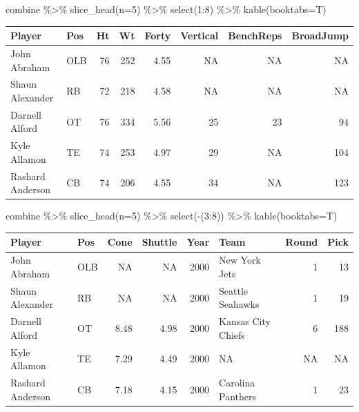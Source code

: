 \documentclass[
  11pt,
]{book}
\newenvironment{Shaded}{\begin{snugshade}}{\end{snugshade}}
\newcommand{\AttributeTok}[1]{\textcolor[rgb]{0.77,0.63,0.00}{#1}}
\newcommand{\DecValTok}[1]{\textcolor[rgb]{0.00,0.00,0.81}{#1}}
\newcommand{\FunctionTok}[1]{\textcolor[rgb]{0.00,0.00,0.00}{#1}}
\newcommand{\NormalTok}[1]{#1}
\newcommand{\SpecialCharTok}[1]{\textcolor[rgb]{0.00,0.00,0.00}{#1}}
\theoremstyle{definition}
\theoremstyle{definition}
\theoremstyle{definition}
\theoremstyle{definition}
\theoremstyle{remark}
\begin{document}
\begin{Shaded}
\begin{Highlighting}[]
\NormalTok{combine }\SpecialCharTok{\%\textgreater{}\%} \FunctionTok{slice\_head}\NormalTok{(}\AttributeTok{n=}\DecValTok{5}\NormalTok{) }\SpecialCharTok{\%\textgreater{}\%} \FunctionTok{select}\NormalTok{(}\DecValTok{1}\SpecialCharTok{:}\DecValTok{8}\NormalTok{) }\SpecialCharTok{\%\textgreater{}\%} \FunctionTok{kable}\NormalTok{(}\AttributeTok{booktabs=}\NormalTok{T)}
\end{Highlighting}
\end{Shaded}

\begin{tabular}{llrrrrrr}
\toprule
Player & Pos & Ht & Wt & Forty & Vertical & BenchReps & BroadJump\\
\midrule
John Abraham & OLB & 76 & 252 & 4.55 & NA & NA & NA\\
Shaun Alexander & RB & 72 & 218 & 4.58 & NA & NA & NA\\
Darnell Alford & OT & 76 & 334 & 5.56 & 25 & 23 & 94\\
Kyle Allamon & TE & 74 & 253 & 4.97 & 29 & NA & 104\\
Rashard Anderson & CB & 74 & 206 & 4.55 & 34 & NA & 123\\
\bottomrule
\end{tabular}

\begin{Shaded}
\begin{Highlighting}[]
\NormalTok{combine }\SpecialCharTok{\%\textgreater{}\%} \FunctionTok{slice\_head}\NormalTok{(}\AttributeTok{n=}\DecValTok{5}\NormalTok{) }\SpecialCharTok{\%\textgreater{}\%} \FunctionTok{select}\NormalTok{(}\SpecialCharTok{{-}}\NormalTok{(}\DecValTok{3}\SpecialCharTok{:}\DecValTok{8}\NormalTok{)) }\SpecialCharTok{\%\textgreater{}\%} \FunctionTok{kable}\NormalTok{(}\AttributeTok{booktabs=}\NormalTok{T)}
\end{Highlighting}
\end{Shaded}

\begin{tabular}{llrrrlrr}
\toprule
Player & Pos & Cone & Shuttle & Year & Team & Round & Pick\\
\midrule
John Abraham & OLB & NA & NA & 2000 & New York Jets & 1 & 13\\
Shaun Alexander & RB & NA & NA & 2000 & Seattle Seahawks & 1 & 19\\
Darnell Alford & OT & 8.48 & 4.98 & 2000 & Kansas City Chiefs & 6 & 188\\
Kyle Allamon & TE & 7.29 & 4.49 & 2000 & NA & NA & NA\\
Rashard Anderson & CB & 7.18 & 4.15 & 2000 & Carolina Panthers & 1 & 23\\
\bottomrule
\end{tabular}
\end{document}
